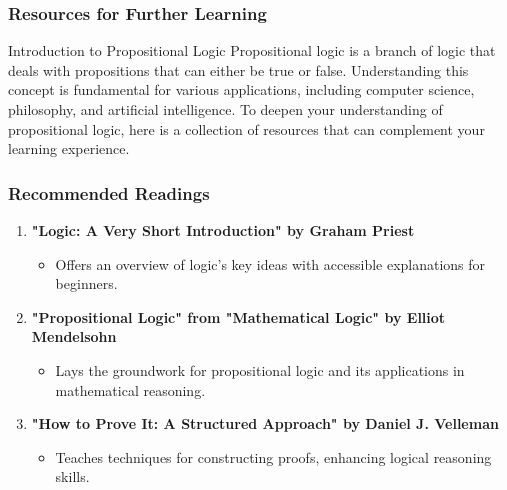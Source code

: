 \documentclass[aspectratio=169]{beamer}
\begin{document}
\begin{frame}[fragile]
  \frametitle{Resources for Further Learning}
  \begin{block}{Introduction to Propositional Logic}
    Propositional logic is a branch of logic that deals with propositions that can either be true or false. Understanding this concept is fundamental for various applications, including computer science, philosophy, and artificial intelligence.
    To deepen your understanding of propositional logic, here is a collection of resources that can complement your learning experience.
  \end{block}
\end{frame}

\begin{frame}[fragile]
  \frametitle{Recommended Readings}
  \begin{enumerate}
    \item \textbf{"Logic: A Very Short Introduction" by Graham Priest}
      \begin{itemize}
        \item Offers an overview of logic's key ideas with accessible explanations for beginners.
      \end{itemize}

    \item \textbf{"Propositional Logic" from "Mathematical Logic" by Elliot Mendelsohn}
      \begin{itemize}
        \item Lays the groundwork for propositional logic and its applications in mathematical reasoning.
      \end{itemize}

    \item \textbf{"How to Prove It: A Structured Approach" by Daniel J. Velleman}
      \begin{itemize}
        \item Teaches techniques for constructing proofs, enhancing logical reasoning skills.
      \end{itemize}
  \end{enumerate}
\end{frame}
\end{document}
